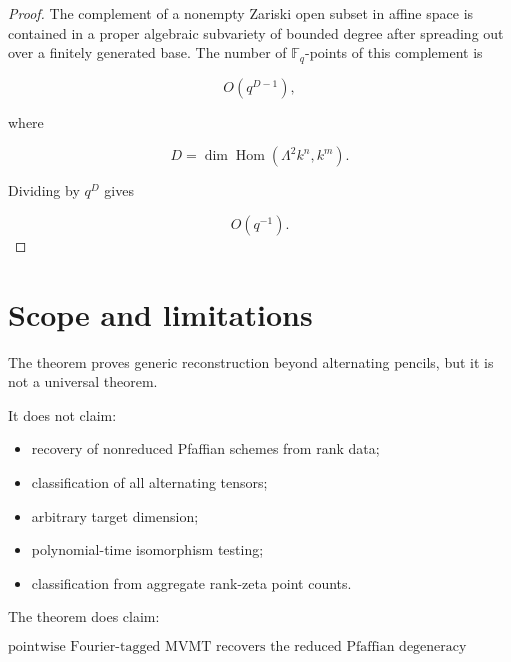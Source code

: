 \documentclass[11pt]{article}
\begin{document}
\begin{proof}

The complement of a nonempty Zariski open subset in affine space is contained in a proper algebraic subvariety of bounded degree after spreading out over a finitely generated base. The number of $\mathbb F_q$-points of this complement is

\[
O(q^{D-1}),
\]

where

\[
D=\dim \operatorname{Hom}(\Lambda^2 k^n,k^m).
\]

Dividing by $q^D$ gives

\[
O(q^{-1}).
\]

\end{proof}

\section{Scope and limitations}

The theorem proves generic reconstruction beyond alternating pencils, but it is not a universal theorem.

It does not claim:

\begin{itemize}
\item recovery of nonreduced Pfaffian schemes from rank data;
\end{itemize}

\begin{itemize}
\item classification of all alternating tensors;
\end{itemize}

\begin{itemize}
\item arbitrary target dimension;
\end{itemize}

\begin{itemize}
\item polynomial-time isomorphism testing;
\end{itemize}

\begin{itemize}
\item classification from aggregate rank-zeta point counts.
\end{itemize}

The theorem does claim:

\[
\boxed{
\text{pointwise Fourier-tagged MVMT recovers the reduced Pfaffian degeneracy scheme;}
}
\]
\end{document}

